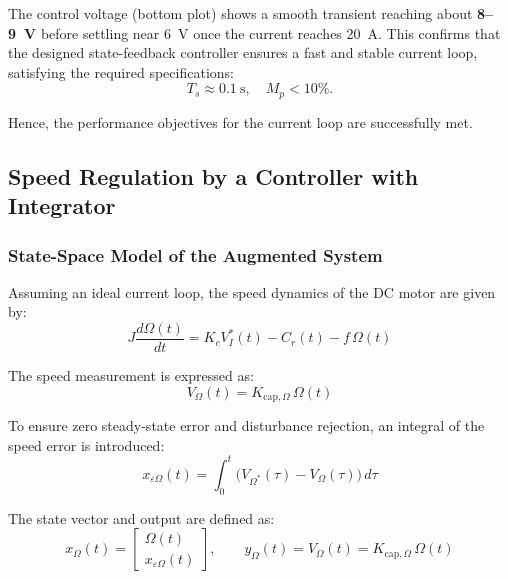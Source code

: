 \documentclass{rapportCS}
\begin{document}
The control voltage (bottom plot) shows a smooth transient reaching about \textbf{8–9~V} before settling near 6~V once the current reaches 20~A.  
This confirms that the designed state-feedback controller ensures a fast and stable current loop, satisfying the required specifications:
\[
T_s \approx 0.1~\text{s}, \quad M_p < 10\%.
\]

Hence, the performance objectives for the current loop are successfully met.


\subsection{Speed Regulation by a Controller with Integrator}
\subsubsection{State-Space Model of the Augmented System}

Assuming an ideal current loop, the speed dynamics of the DC motor are given by:
\begin{equation*}
J\frac{d\Omega(t)}{dt} = K_c V_I^*(t) - C_r(t) - f\,\Omega(t)
\end{equation*}

The speed measurement is expressed as:
\begin{equation*}
V_\Omega(t) = K_{\mathrm{cap},\Omega}\,\Omega(t)
\end{equation*}

To ensure zero steady-state error and disturbance rejection, an integral of the speed error is introduced:
\begin{equation*}
x_{\varepsilon \Omega}(t) = \int_0^t \big(V_{\Omega^*}(\tau) - V_\Omega(\tau)\big)\,d\tau
\end{equation*}

The state vector and output are defined as:
\begin{equation*}
x_\Omega(t) =
\begin{bmatrix}
\Omega(t) \\[4pt]
x_{\varepsilon \Omega}(t)
\end{bmatrix},
\qquad
y_\Omega(t) = V_\Omega(t) = K_{\mathrm{cap},\Omega}\,\Omega(t)
\end{equation*}
\end{document}
